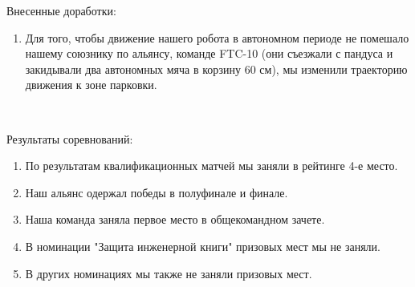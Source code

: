 Внесенные доработки:
\begin{enumerate}
	\item Для того, чтобы движение нашего робота в автономном периоде не помешало нашему союзнику по альянсу, команде FTC-10 (они съезжали с пандуса и закидывали два автономных мяча в корзину 60 см), мы изменили траекторию движения к зоне парковки.
	\begin{figure}[H]
		\begin{minipage}[h]{0.2\linewidth}
			\center  
		\end{minipage}
		\begin{minipage}[h]{0.6\linewidth}
			\caption{}
		\end{minipage}
	\end{figure}
	
\end{enumerate}

Результаты соревнований:
\begin{enumerate}
	\item По результатам квалификационных матчей мы заняли в рейтинге 4-е место.
	
	\item Наш альянс одержал победы в полуфинале и финале.
	
	\item Наша команда заняла первое место в общекомандном зачете.
	
	\item В номинации "Защита инженерной книги" призовых мест мы не заняли.
	
	\item В других номинациях мы также не заняли призовых мест.
\end{enumerate}

